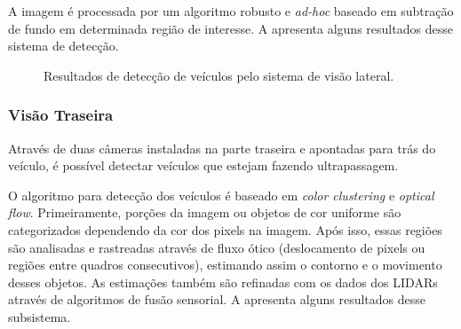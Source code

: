 A imagem é processada por um algoritmo robusto e \emph{ad-hoc} baseado em subtração de fundo em determinada região de interesse. A  apresenta alguns resultados desse sistema de detecção.

\begin{figure}[h]
\centering
{}\quad
{}
\caption{Resultados de detecção de veículos pelo sistema de visão lateral.}%
\label{fig:lateral}%
\end{figure}

\subsubsection{Visão Traseira}

Através de duas câmeras instaladas na parte traseira e apontadas para trás do veículo, é possível detectar veículos que estejam fazendo ultrapassagem.

O algoritmo para detecção dos veículos é baseado em \emph{color clustering} e \emph{optical flow}. Primeiramente, porções da imagem ou objetos de cor uniforme são categorizados dependendo da cor dos pixels na imagem. Após isso, essas regiões são analisadas e rastreadas através de fluxo ótico (deslocamento de pixels ou regiões entre quadros consecutivos), estimando assim o contorno e o movimento desses objetos. As estimações também são refinadas com os dados dos LIDARs através de algoritmos de fusão sensorial. A  apresenta alguns resultados desse subsistema.

